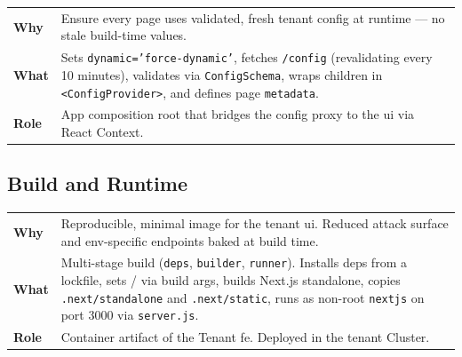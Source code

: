 \documentclass[11pt, a4paper, oneside, listof=totoc]{scrartcl}
\makeatletter
\newcommand{\codesummary}[3]{%
    \vspace{0.4\baselineskip}%
    \noindent\begin{tabularx}{\linewidth}{@{}>{\bfseries}l X@{}}
    Why  & #1\\
    What & #2\\
    Role & #3\\
    \end{tabularx}%
    \vspace{0.2\baselineskip}%
}
\makeatother
\begin{document}
                \codesummary
                    {Ensure every page uses validated, fresh tenant config at runtime --- no stale build-time values.}
                    {Sets \texttt{dynamic='force-dynamic'}, fetches \texttt{/config} (revalidating every 10 minutes), validates via \texttt{ConfigSchema}, wraps children in \texttt{<ConfigProvider>}, and defines page \texttt{metadata}.}
                    {App composition root that bridges the config proxy to the \gls{ui} via React Context.}

        \clearpage

            \subsection{Build and Runtime}
                \codesummary
                    {Reproducible, minimal image for the tenant \gls{ui}. Reduced attack surface and env-specific endpoints baked at build time.}
                    {Multi-stage build (\texttt{deps}, \texttt{builder}, \texttt{runner}). Installs deps from a lockfile, sets \texttt{\detokenize{CONFIG_ENDPOINT}}/\texttt{\detokenize{CRASH_ENDPOINT}} via build args, builds Next.js standalone, copies \texttt{.next/standalone} and \texttt{.next/static}, runs as non-root \texttt{nextjs} on port 3000 via \texttt{server.js}.}
                    {Container artifact of the Tenant \gls{fe}. Deployed in the tenant Cluster.}
\end{document}
